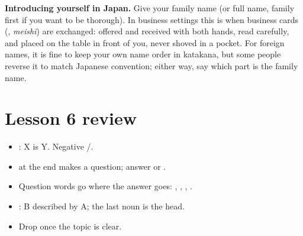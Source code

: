 \begin{aside}
\textbf{Introducing yourself in Japan.} Give your family name (or full name, family
first if you want to be thorough). In business settings this is when business cards
(, \emph{meishi}) are exchanged: offered and received with both hands, read
carefully, and placed on the table in front of you, never shoved in a pocket. For
foreign names, it is fine to keep your own name order in katakana, but some people
reverse it to match Japanese convention; either way, say which part is the family name.
\end{aside}

\section*{Lesson 6 review}
\begin{itemize}
  \item {}: X is Y. Negative /.
  \item {} at the end makes a question; answer  or
        .
  \item Question words go where the answer goes: , , ,
        .
  \item {}: B described by A; the last noun is the head.
  \item Drop  once the topic is clear.
\end{itemize}
